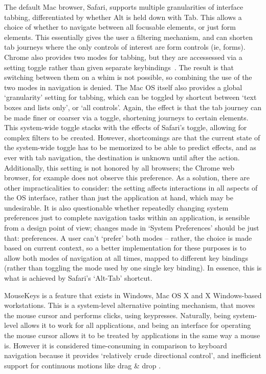 \documentclass[11pt,openright,a4paper]{report}
\begin{document}
The default Mac browser, Safari, supports multiple granularities of interface tabbing, differentiated by whether Alt is held down with Tab\cite{safaria11y}. This allows a choice of whether to navigate between all focusable elements, or just form elements. This essentially gives the user a filtering mechanism, and can shorten tab journeys where the only controls of interest are form controls (ie, forms). Chrome also provides two modes for tabbing, but they are accessessed via a setting toggle rather than given separate keybindings~\cite{browserkeyboardaccess}. The result is that switching between them on a whim is not possible, so combining the use of the two modes in navigation is denied.
The Mac OS itself also provides a global `granularity' setting for tabbing, which can be toggled by shortcut between `text boxes and lists only', or `all controls'\cite{macshortcuts}. Again, the effect is that the tab journey can be made finer or coarser via a toggle, shortening journeys to certain elements. This system-wide toggle stacks with the effects of Safari's toggle, allowing for complex filters to be created. However, shortcomings are that the current state of the system-wide toggle has to be memorized to be able to predict effects, and as ever with tab navigation, the destination is unknown until after the action. Additionally, this setting is not honored by all browsers; the Chrome web browser, for example does not observe this preference\cite{browserkeyboardaccess}.
As a solution, there are other impracticalities to consider: the setting affects interactions in all aspects of the OS interface, rather than just the application at hand, which may be undesirable. It is also questionable whether repeatedly changing system preferences just to complete navigation tasks within an application, is sensible from a design point of view; changes made in `System Preferences' should be just that: preferences. A user can't `prefer' both modes -- rather, the choice is made based on current context, so a better implementation for these purposes is to allow both modes of navigation at all times, mapped to different key bindings (rather than toggling the mode used by one single key binding). In essence, this is what is achieved by Safari's `Alt-Tab' shortcut.

MouseKeys is a feature that exists in Windows, Mac OS X and X Windows-based workstations. This is a system-level alternative pointing mechanism, that moves the mouse cursor and performs clicks, using keypresses. Naturally, being system-level allows it to work for all applications, and being an interface for operating the mouse cursor allows it to be treated by applications in the same way a mouse is. However it is considered time-consuming in comparison to keyboard navigation because it provides `relatively crude directional control', and inefficient support for continuous motions like drag \& drop \cite{bergman1995towards}.
\end{document}
